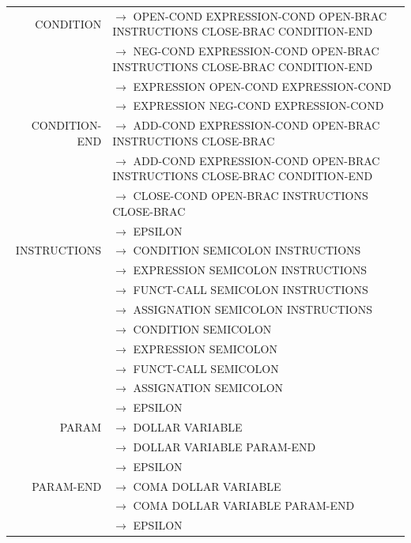 \documentclass[a4paper,10pt]{article}
\begin{document}
\begin{center}
\begin{longtable}{rl}
CONDITION			& $\rightarrow$ OPEN-COND EXPRESSION-COND OPEN-BRAC INSTRUCTIONS CLOSE-BRAC CONDITION-END\\
					& $\rightarrow$ NEG-COND EXPRESSION-COND OPEN-BRAC INSTRUCTIONS CLOSE-BRAC CONDITION-END\\
					& $\rightarrow$ EXPRESSION OPEN-COND EXPRESSION-COND \\
					& $\rightarrow$ EXPRESSION NEG-COND EXPRESSION-COND \\


CONDITION-END		& $\rightarrow$ ADD-COND EXPRESSION-COND OPEN-BRAC INSTRUCTIONS CLOSE-BRAC \\
					& $\rightarrow$ ADD-COND EXPRESSION-COND OPEN-BRAC INSTRUCTIONS CLOSE-BRAC CONDITION-END \\
					& $\rightarrow$ CLOSE-COND OPEN-BRAC INSTRUCTIONS CLOSE-BRAC\\
					& $\rightarrow$ EPSILON \\
					
					
					
					
					
INSTRUCTIONS		& $\rightarrow$ CONDITION SEMICOLON INSTRUCTIONS\\
					& $\rightarrow$ EXPRESSION SEMICOLON INSTRUCTIONS\\
					& $\rightarrow$ FUNCT-CALL SEMICOLON INSTRUCTIONS\\
					& $\rightarrow$ ASSIGNATION SEMICOLON INSTRUCTIONS\\
					& $\rightarrow$ CONDITION SEMICOLON \\
					& $\rightarrow$ EXPRESSION SEMICOLON \\
					& $\rightarrow$ FUNCT-CALL SEMICOLON \\
					& $\rightarrow$ ASSIGNATION SEMICOLON \\
					& $\rightarrow$ EPSILON \\
					
					
					
PARAM				& $\rightarrow$ DOLLAR VARIABLE \\
					& $\rightarrow$ DOLLAR VARIABLE PARAM-END\\
					& $\rightarrow$ EPSILON \\
PARAM-END			& $\rightarrow$ COMA DOLLAR VARIABLE \\ 
					& $\rightarrow$ COMA DOLLAR VARIABLE PARAM-END\\ 
					& $\rightarrow$ EPSILON \\




\end{longtable}
\end{center}
\end{document}
